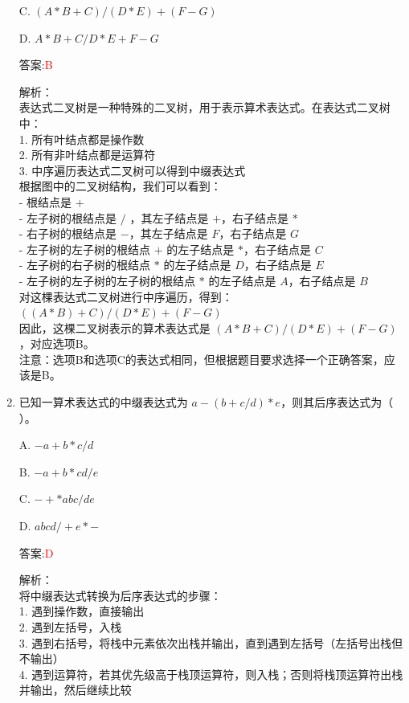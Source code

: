 \documentclass[lang=cn,newtx,10pt,scheme=chinese]{../../../elegantbook}
\begin{document}
\begin{enumerate}
    C. $(A \ast B + C) / (D \ast E) + (F - G)$  

    D. $A \ast B + C / D \ast E + F - G$  
    
    答案:\textcolor{red}{B}
    
    解析：\\
    表达式二叉树是一种特殊的二叉树，用于表示算术表达式。在表达式二叉树中：\\
    1. 所有叶结点都是操作数\\
    2. 所有非叶结点都是运算符\\
    3. 中序遍历表达式二叉树可以得到中缀表达式\\
    
    根据图中的二叉树结构，我们可以看到：\\
    - 根结点是 $+$\\
    - 左子树的根结点是 $/$ ，其左子结点是 $+$，右子结点是 $*$\\
    - 右子树的根结点是 $-$，其左子结点是 $F$，右子结点是 $G$\\
    - 左子树的左子树的根结点 $+$ 的左子结点是 $*$，右子结点是 $C$\\
    - 左子树的右子树的根结点 $*$ 的左子结点是 $D$，右子结点是 $E$\\
    - 左子树的左子树的左子树的根结点 $*$ 的左子结点是 $A$，右子结点是 $B$\\
    
    对这棵表达式二叉树进行中序遍历，得到：\\
    $((A * B) + C) / (D * E) + (F - G)$\\
    
    因此，这棵二叉树表示的算术表达式是 $(A * B + C) / (D * E) + (F - G)$，对应选项B。\\
    
    注意：选项B和选项C的表达式相同，但根据题目要求选择一个正确答案，应该是B。\\  

    \item 已知一算术表达式的中缀表达式为 $a - (b + c/d) \ast e$，则其后序表达式为（ ）。
    
    A. $-a + b \ast c / d$  

    B. $-a + b \ast cd/e$  


    C. $-+*abc/de$  

    D. $abcd /+e*-$  
    
    答案:\textcolor{red}{D}
    
    解析：\\
    将中缀表达式转换为后序表达式的步骤：\\
    1. 遇到操作数，直接输出\\
    2. 遇到左括号，入栈\\
    3. 遇到右括号，将栈中元素依次出栈并输出，直到遇到左括号（左括号出栈但不输出）\\
    4. 遇到运算符，若其优先级高于栈顶运算符，则入栈；否则将栈顶运算符出栈并输出，然后继续比较\\
    

\end{enumerate}
\end{document}
